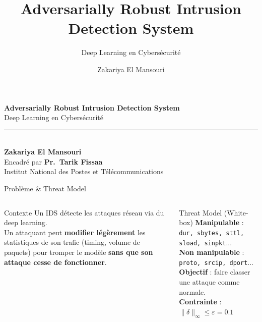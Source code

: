 \documentclass[aspectratio=169,11pt]{beamer}
\title[Adversarially Robust IDS]{Adversarially Robust Intrusion Detection System}
\subtitle{Deep Learning en Cybers\'ecurit\'e}
\author{Zakariya El Mansouri}
\institute{INPT}
\date{}
\begin{document}
\begin{frame}[plain]
\vspace{2.2cm}
\begin{center}
{\large\bfseries\color{inptblue} Adversarially Robust Intrusion Detection System}\\[0.3em]
{\small\color{inptcyan} Deep Learning en Cybers\'ecurit\'e}\\[0.6em]
{\color{inptcyan!60}\rule{0.7\textwidth}{0.6pt}}\\[0.5em]
{\normalsize\color{inptblue}\textbf{Zakariya El Mansouri}}\\[0.2em]
{\small\color{gray} Encadr\'e par \textbf{Pr.~Tarik Fissaa}}\\[0.1em]
{\small\color{gray} Institut National des Postes et T\'el\'ecommunications}
\end{center}
\end{frame}

\begin{frame}{Probl\`eme \& Threat Model}
\begin{columns}[T]
\begin{block}{Contexte}
Un IDS d\'etecte les attaques r\'eseau via du deep learning.\\[0.4em]
Un attaquant peut \textbf{modifier l\'eg\`erement} les statistiques
de son trafic (timing, volume de paquets) pour tromper le mod\`ele
\textbf{sans que son attaque cesse de fonctionner}.
\end{block}

\begin{alertblock}{Threat Model (White-box)}
\textbf{Manipulable} : \texttt{dur, sbytes, sttl, sload, sinpkt}...\\[0.3em]
\textbf{Non manipulable} : \texttt{proto, srcip, dport}...\\[0.4em]
\textbf{Objectif} : faire classer une attaque comme normale.\\[0.2em]
\textbf{Contrainte} : $\|\delta\|_\infty \leq \varepsilon = 0.1$
\end{alertblock}
\end{columns}
\end{frame}
\end{document}
